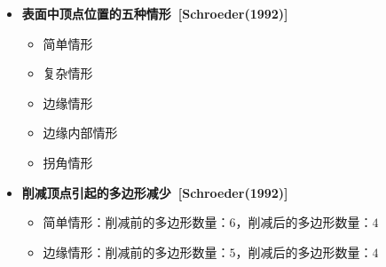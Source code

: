 \begin{frame}
\begin{itemize}
  \item \textbf{表面中顶点位置的五种情形~[Schroeder(1992)]}
  \begin{itemize}
     \item 简单情形
     \item 复杂情形
     \item 边缘情形
     \item 边缘内部情形
     \item 拐角情形
  \end{itemize}
\end{itemize}
\begin{figure}
\begin{minipage}[t]{0.8\linewidth}
\centering
\end{minipage}
\end{figure}
\end{frame}

\begin{frame}
\begin{itemize}
  \item \textbf{削减顶点引起的多边形减少~[Schroeder(1992)]}
  \begin{itemize}
     \item 简单情形：削减前的多边形数量：$6$，削减后的多边形数量：$4$
     \item 边缘情形：削减前的多边形数量：$5$，削减后的多边形数量：$4$
  \end{itemize}
\end{itemize}
\begin{figure}
\begin{minipage}[t]{0.8\linewidth}
\centering
\end{minipage}
\end{figure}
\end{frame}


